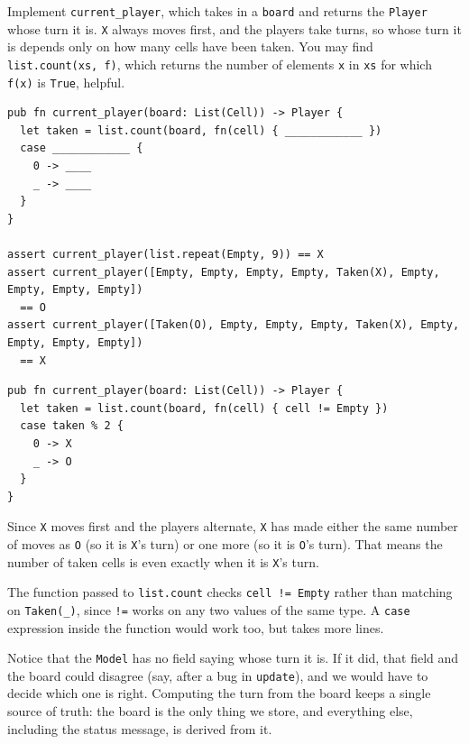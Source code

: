 \begin{blocksection}
\question Implement \texttt{current\_player}, which takes in a \texttt{board} and returns the \lstinline{Player} whose turn it is. \texttt{X} always moves first, and the players take turns, so whose turn it is depends only on how many cells have been taken. You may find \lstinline{list.count(xs, f)}, which returns the number of elements \texttt{x} in \texttt{xs} for which \lstinline{f(x)} is \lstinline{True}, helpful.
\begin{lstlisting}
pub fn current_player(board: List(Cell)) -> Player {
  let taken = list.count(board, fn(cell) { ____________ })
  case ____________ {
    0 -> ____
    _ -> ____
  }
}

assert current_player(list.repeat(Empty, 9)) == X
assert current_player([Empty, Empty, Empty, Empty, Taken(X), Empty, Empty, Empty, Empty])
  == O
assert current_player([Taken(O), Empty, Empty, Empty, Taken(X), Empty, Empty, Empty, Empty])
  == X
\end{lstlisting}

\begin{solution}
\begin{lstlisting}
pub fn current_player(board: List(Cell)) -> Player {
  let taken = list.count(board, fn(cell) { cell != Empty })
  case taken % 2 {
    0 -> X
    _ -> O
  }
}
\end{lstlisting}
\end{solution}

\begin{questionmeta}
  Since \texttt{X} moves first and the players alternate, \texttt{X} has made either the same number of moves as \texttt{O} (so it is \texttt{X}'s turn) or one more (so it is \texttt{O}'s turn). That means the number of taken cells is even exactly when it is \texttt{X}'s turn.

  The function passed to \lstinline{list.count} checks \lstinline{cell != Empty} rather than matching on \lstinline{Taken(_)}, since \lstinline{!=} works on any two values of the same type. A \lstinline{case} expression inside the function would work too, but takes more lines.

  Notice that the \lstinline{Model} has no field saying whose turn it is. If it did, that field and the board could disagree (say, after a bug in \texttt{update}), and we would have to decide which one is right. Computing the turn from the board keeps a single source of truth: the board is the only thing we store, and everything else, including the status message, is derived from it.
\end{questionmeta}
\end{blocksection}

